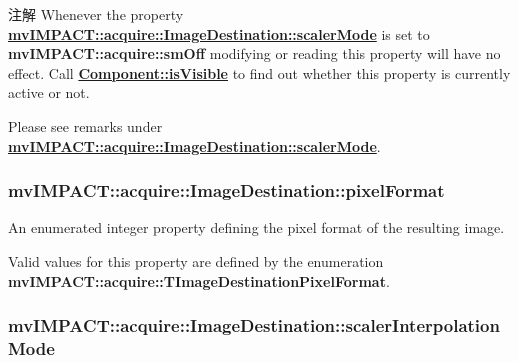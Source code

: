 \begin{DoxyNote}{注解}
Whenever the property {\bfseries \hyperlink{classmv_i_m_p_a_c_t_1_1acquire_1_1_image_destination_a0e85ee4b320d7b84f664d00d02965c73}{mv\+I\+M\+P\+A\+C\+T\+::acquire\+::\+Image\+Destination\+::scaler\+Mode}} is set to {\bfseries mv\+I\+M\+P\+A\+C\+T\+::acquire\+::sm\+Off} modifying or reading this property will have no effect. Call {\bfseries \hyperlink{classmv_i_m_p_a_c_t_1_1acquire_1_1_component_ae9f95ac45440af06f7d36990ad633a73}{Component\+::is\+Visible}} to find out whether this property is currently active or not.

Please see remarks under {\bfseries \hyperlink{classmv_i_m_p_a_c_t_1_1acquire_1_1_image_destination_a0e85ee4b320d7b84f664d00d02965c73}{mv\+I\+M\+P\+A\+C\+T\+::acquire\+::\+Image\+Destination\+::scaler\+Mode}}. 
\end{DoxyNote}
\hypertarget{classmv_i_m_p_a_c_t_1_1acquire_1_1_image_destination_abfd0d30346d66251d5941a5e57efb784}{
\subsubsection[{pixel\+Format}]{ mv\+I\+M\+P\+A\+C\+T\+::acquire\+::\+Image\+Destination\+::pixel\+Format}}\label{classmv_i_m_p_a_c_t_1_1acquire_1_1_image_destination_abfd0d30346d66251d5941a5e57efb784}


An enumerated integer property defining the pixel format of the resulting image. 

Valid values for this property are defined by the enumeration {\bfseries mv\+I\+M\+P\+A\+C\+T\+::acquire\+::\+T\+Image\+Destination\+Pixel\+Format}. \hypertarget{classmv_i_m_p_a_c_t_1_1acquire_1_1_image_destination_afea899675c351778785fe0e0d4f4d29c}{
\subsubsection[{scaler\+Interpolation\+Mode}]{ mv\+I\+M\+P\+A\+C\+T\+::acquire\+::\+Image\+Destination\+::scaler\+Interpolation\+Mode}}\label{classmv_i_m_p_a_c_t_1_1acquire_1_1_image_destination_afea899675c351778785fe0e0d4f4d29c}


